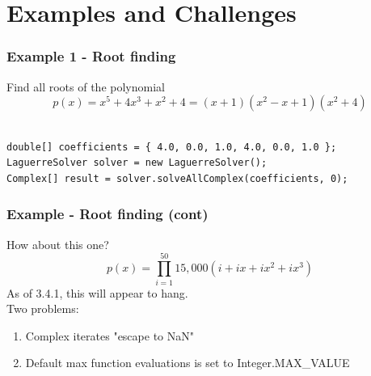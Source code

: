 \documentclass[14pt,mathserif]{beamer}
\begin{document}
\section[Examples]{Examples and Challenges}
\begin{frame}[fragile]
  \frametitle{Example 1 - Root finding}

\begin{small}
Find all roots of the polynomial \[p(x) = x^5 + 4x^3 + x^2 + 4 = (x+1)(x^2-x+1)(x^2+4)\]
\end{small}
\begin{verbatim}

double[] coefficients = { 4.0, 0.0, 1.0, 4.0, 0.0, 1.0 };
LaguerreSolver solver = new LaguerreSolver();
Complex[] result = solver.solveAllComplex(coefficients, 0);
\end{verbatim}
\end{frame}

\begin{frame}[fragile]
  \frametitle{Example - Root finding (cont)}

How about this one? \[p(x) = \prod\limits_{i=1}^{50}{15,000(i + ix + ix^2 + ix^3)}\]
As of 3.4.1, this will appear to hang.\\
Two problems:
\begin{enumerate}
  \item Complex iterates "escape to NaN"
  \item Default max function evaluations is set to Integer.MAX\_VALUE
\end{enumerate}
\end{frame}
\end{document}
